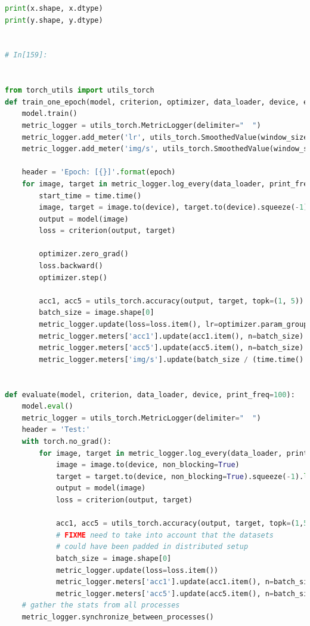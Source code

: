 \documentclass[10pt, twocolumn, letterpaper]{article}
\begin{document}
\begin{lstlisting}[language=Python]
print(x.shape, x.dtype)
print(y.shape, y.dtype)


# In[159]:


from torch_utils import utils_torch
def train_one_epoch(model, criterion, optimizer, data_loader, device, epoch, print_freq, apex=False):
    model.train()
    metric_logger = utils_torch.MetricLogger(delimiter="  ")
    metric_logger.add_meter('lr', utils_torch.SmoothedValue(window_size=1, fmt='{value}'))
    metric_logger.add_meter('img/s', utils_torch.SmoothedValue(window_size=10, fmt='{value}'))

    header = 'Epoch: [{}]'.format(epoch)
    for image, target in metric_logger.log_every(data_loader, print_freq, header):
        start_time = time.time()
        image, target = image.to(device), target.to(device).squeeze(-1).long()
        output = model(image)
        loss = criterion(output, target)

        optimizer.zero_grad()
        loss.backward()
        optimizer.step()

        acc1, acc5 = utils_torch.accuracy(output, target, topk=(1, 5))
        batch_size = image.shape[0]
        metric_logger.update(loss=loss.item(), lr=optimizer.param_groups[0]["lr"])
        metric_logger.meters['acc1'].update(acc1.item(), n=batch_size)
        metric_logger.meters['acc5'].update(acc5.item(), n=batch_size)
        metric_logger.meters['img/s'].update(batch_size / (time.time() - start_time))


def evaluate(model, criterion, data_loader, device, print_freq=100):
    model.eval()
    metric_logger = utils_torch.MetricLogger(delimiter="  ")
    header = 'Test:'
    with torch.no_grad():
        for image, target in metric_logger.log_every(data_loader, print_freq, header):
            image = image.to(device, non_blocking=True)
            target = target.to(device, non_blocking=True).squeeze(-1).long()
            output = model(image)
            loss = criterion(output, target)

            acc1, acc5 = utils_torch.accuracy(output, target, topk=(1,5))
            # FIXME need to take into account that the datasets
            # could have been padded in distributed setup
            batch_size = image.shape[0]
            metric_logger.update(loss=loss.item())
            metric_logger.meters['acc1'].update(acc1.item(), n=batch_size)
            metric_logger.meters['acc5'].update(acc5.item(), n=batch_size)
    # gather the stats from all processes
    metric_logger.synchronize_between_processes()


\end{lstlisting}
\end{document}
